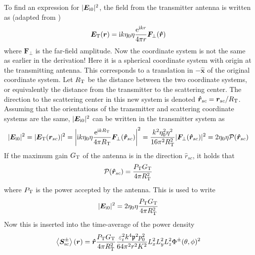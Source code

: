 \documentclass[11pt,twoside]{eitExjobb}
\begin{document}
	To find an expression for $|\bm{E}_{\mathrm{i}0}|^2$, the field from the transmitter antenna is written as (adapted from \cite{Orfanidis2016})
	\begin{equation*}
		\bm{E}_{\mathrm{T}} (\bm{r}) = \mathrm{i} k\eta_0\eta \frac{\mathrm{e}^{\mathrm{i} kr}}{4\pi r} \bm{F}_\perp (\bm{\hat{r}})
	\end{equation*}
	where $\bm{F}_\perp$ is the far-field amplitude. Now the coordinate system is not the same as earlier in the derivation! Here it is a spherical coordinate system with origin at the transmitting antenna. This corresponds to a translation in $-\bm{\hat{x}}$ of the original coordinate system. Let $R_{\mathrm{T}}$ be the distance between the two coordinate systems, or equivalently the distance from the transmitter to the scattering center. The direction to the scattering center in this new system is denoted $\bm{\hat{r}}_{sc} = \bm{r}_{sc}/R_{\mathrm{T}}$. Assuming that the orientations of the transmitter and scattering coordinate systems are the same, $|\bm{E}_{\mathrm{i}0}|^2$ can be written in the transmitter system as \cite{Orfanidis2016}
	\begin{equation*}
		|\bm{E}_{\mathrm{i}0}|^2 = |\bm{E}_{\mathrm{T}}(\bm{r}_{sc})|^2 = \left| \mathrm{i} k\eta_0\eta \frac{\mathrm{e}^{\mathrm{i} kR_{\mathrm{T}}}}{4\pi R_{\mathrm{T}}} \bm{F}_\perp (\bm{\hat{r}}_{sc}) \right|^2 = \frac{k^2 \eta_0^2 \eta^2}{16 \pi^2 R_{\mathrm{T}}^2} |\bm{F}_\perp (\bm{\hat{r}}_{sc})|^2 = 2\eta_0 \eta \mathcal{P}(\bm{\hat{r}}_{sc})
	\end{equation*}
	If the maximum gain $G_{\mathrm{T}}$ of the antenna is in the direction $\hat{r}_{sc}$, it holds that \cite{Orfanidis2016}
	\begin{equation*}
		\mathcal{P}(\bm{\hat{r}}_{sc}) = \frac{P_{\mathrm{T}} G_{\mathrm{T}}}{4\pi R_{\mathrm{T}}^2}
	\end{equation*}
	where $P_{\mathrm{T}}$ is the power accepted by the antenna. This is used to write
	\begin{equation*}
		|\bm{E}_{\mathrm{i}0}|^2 = 2\eta_0 \eta \frac{P_{\mathrm{T}} G_{\mathrm{T}}}{4\pi R_{\mathrm{T}}^2}
	\end{equation*}
	Now this is inserted into the time-average of the power density
	\begin{equation*}
		\left< \bm{S}_{\mathrm{sc}}^\pm \right> (\bm{r}) = \bm{\hat{r}} \frac{P_{\mathrm{T}} G_{\mathrm{T}}}{4\pi R_{\mathrm{T}}^2} \frac{\varepsilon_{\mathrm{r}}^2 k^4 \mathfrak{p}^2 p_0^2}{64\pi^2 r^2 K^2} L_{x}^2 L_{y}^2 L_{z}^2 \Phi^\pm (\theta,\phi)^2
	\end{equation*}
	
\end{document}
